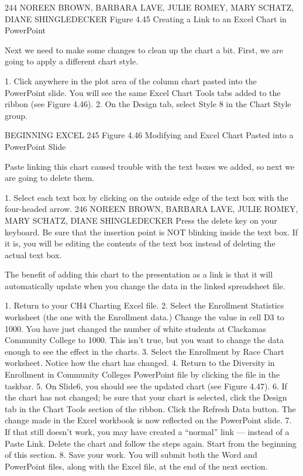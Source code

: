 244 NOREEN BROWN, BARBARA LAVE, JULIE ROMEY, MARY SCHATZ, DIANE SHINGLEDECKER
Figure 4.45 Creating a Link to an Excel Chart in PowerPoint


Next we need to make some changes to clean up the chart a bit. First, we are going to apply a different
chart style.

1. Click anywhere in the plot area of the column chart pasted into the PowerPoint slide. You will
see the same Excel Chart Tools tabs added to the ribbon (see Figure 4.46).
2. On the Design tab, select Style 8 in the Chart Style group.




BEGINNING EXCEL 245
Figure 4.46 Modifying and Excel Chart Pasted into a PowerPoint Slide


Paste linking this chart caused trouble with the text boxes we added, so next we are going to delete
them.

1. Select each text box by clicking on the outside edge of the text box with the four-headed arrow.
246 NOREEN BROWN, BARBARA LAVE, JULIE ROMEY, MARY SCHATZ, DIANE SHINGLEDECKER
Press the delete key on your keyboard. Be sure that the insertion point is NOT blinking inside
the text box. If it is, you will be editing the contents of the text box instead of deleting the actual
text box.

The benefit of adding this chart to the presentation as a link is that it will automatically update when
you change the data in the linked spreadsheet file.

1. Return to your CH4 Charting Excel file.
2. Select the Enrollment Statistics worksheet (the one with the Enrollment data.) Change the
value in cell D3 to 1000. You have just changed the number of white students at Clackamas
Community College to 1000. This isn’t true, but you want to change the data enough to see the
effect in the charts.
3. Select the Enrollment by Race Chart worksheet. Notice how the chart has changed.
4. Return to the Diversity in Enrollment in Community Colleges PowerPoint file by clicking the
file in the taskbar.
5. On Slide6, you should see the updated chart (see Figure 4.47).
6. If the chart has not changed; be sure that your chart is selected, click the Design tab in the Chart
Tools section of the ribbon. Click the Refresh Data button. The change made in the Excel
workbook is now reflected on the PowerPoint slide.
7. If that still doesn’t work, you may have created a “normal” link — instead of a Paste Link.
Delete the chart and follow the steps again. Start from the beginning of this section.
8. Save your work. You will submit both the Word and PowerPoint files, along with the Excel file,
at the end of the next section.

